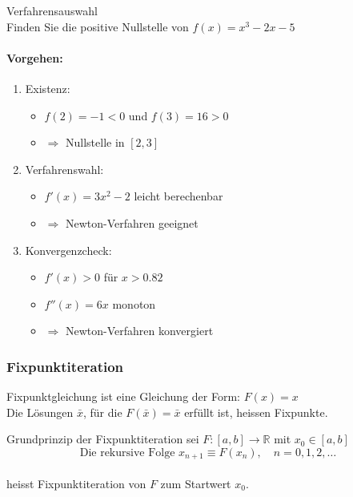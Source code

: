 \begin{example2}{Verfahrensauswahl}\\
Finden Sie die positive Nullstelle von $f(x) = x^3 - 2x - 5$

\paragraph{Vorgehen:}
\begin{enumerate}
    \item Existenz:
    \begin{itemize}
        \item $f(2) = -1 < 0$ und $f(3) = 16 > 0$
        \item $\Rightarrow$ Nullstelle in $[2,3]$
    \end{itemize}
    
    \item Verfahrenswahl:
    \begin{itemize}
        \item $f'(x) = 3x^2 - 2$ leicht berechenbar
        \item $\Rightarrow$ Newton-Verfahren geeignet
    \end{itemize}
    
    \item Konvergenzcheck:
    \begin{itemize}
        \item $f'(x) > 0$ für $x > 0.82$
        \item $f''(x) = 6x$ monoton
        \item $\Rightarrow$ Newton-Verfahren konvergiert
    \end{itemize}
\end{enumerate}
\end{example2}



\raggedcolumns
\columnbreak


\subsubsection{Fixpunktiteration}

\begin{definition}{Fixpunktgleichung}
ist eine Gleichung der Form: $F(x)=x$\\
Die Lösungen $\bar{x}$, für die $F(\bar{x})=\bar{x}$ erfüllt ist, heissen Fixpunkte.
\end{definition}

\begin{concept}{Grundprinzip der Fixpunktiteration}
sei $F:[a,b] \rightarrow \mathbb{R}$ mit $x_0 \in [a,b]$ 
$$\text{Die rekursive Folge }x_{n+1} \equiv F(x_n), \quad n=0,1,2,\ldots$$
\vspace{-4mm}\\
heisst Fixpunktiteration von $F$ zum Startwert $x_0$.
\end{concept}



